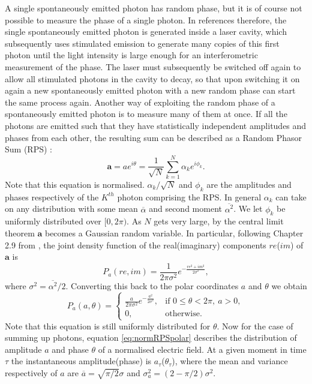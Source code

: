 \documentclass[]{article}
\newcommand*\mean[1]{\overline{#1}}
\begin{document}
	A single spontaneously emitted photon has random phase, but it is of course not possible to measure the phase of a single photon. In references \cite{abellan_ultra-fast_2014,mitchell_strong_2015,abellan_generation_2015} therefore, the single spontaneously emitted photon is generated inside a laser cavity, which subsequently uses stimulated emission to generate many copies of this first photon until the light intensity is large enough for an interferometric measurement of the phase. The laser must subsequently be switched off again to allow all stimulated photons in the cavity to decay, so that upon switching it on again a new spontaneously emitted photon with a new random phase can start the same process again.
	Another way of exploiting the random phase of a spontaneously emitted photon is to measure many of them at once. If all the photons are emitted such that they have statistically independent amplitudes and phases from each other, the resulting sum can be described as a Random Phasor Sum (RPS) \cite{goodman_statistical_2000}:
		\begin{equation}
		\mathbf{a} = ae^{i\theta} = \frac{1}{\sqrt{N}} \sum_{k=1}^{N} \alpha_k e^{i\phi_k}. \label{eq:RPSbasic} 
		\end{equation}
	Note that this equation is normalised. $\alpha_k /\sqrt{N}$ and $\phi_k$ are the amplitudes and phases respectively of the $K^{th}$ photon comprising the RPS. In general $\alpha_k$ can take on any distribution with some mean $\mean{\alpha}$ and second moment $\mean{\alpha^2}$. We let $\phi_k$ be uniformly distributed over $[0,2\pi)$. As $N$ gets very large, by the central limit theorem $\mathbf{a}$ becomes a Gaussian random variable. In particular, following Chapter 2.9 from \cite{goodman_statistical_2000}, the joint density function of the real(imaginary) components $re$($im$) of $\mathbf{a}$ is
		\begin{equation}
		P_{a}(re,im) = \frac{1}{2\pi \sigma^2} e^{-\frac{re^2+im^2}{2 \sigma ^2}},
		\end{equation}
	where $\sigma^2 = \mean{\alpha^2}/2$. Converting this back to the polar coordinates $a$ and $\theta$ we obtain
		\begin{equation}\label{eq:normRPSpolar}
			P_a(a,\theta)= 
		\begin{cases}
		    \frac{a}{2\pi \sigma^2} e^{-\frac{a^2}{2 \sigma ^2}},& \text{if } 0 \leq \theta < 2\pi,\> a>0,\\
		    0,              & \text{otherwise.}
        \end{cases}
        \end{equation}
    Note that this equation is still uniformly distributed for $\theta$. Now for the case of summing up photons, equation \ref{eq:normRPSpolar} describes the distribution of amplitude $a$ and phase $\theta$ of a normalised electric field. At a given moment in time $\tau$ the instantaneous amplitude(phase) is $a_\tau$($\theta_\tau$), where the mean and variance respectively of $a$ are $\mean{a} = \sqrt{\pi/2}\sigma$ and $\sigma_a^2 = (2-\pi/2)\sigma^2$.
\end{document}
